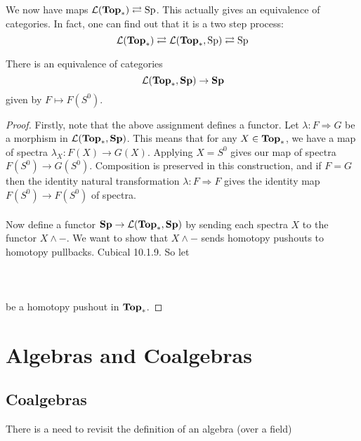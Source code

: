 \documentclass[a4paper]{article}
\begin{document}
We now have maps $\mathcal{L}(\bold{Top}_\ast)\rightleftarrows\text{Sp}$. This actually gives an equivalence of categories. In fact, one can find out that it is a two step process: $$\mathcal{L}(\bold{Top}_\ast)\rightleftarrows\mathcal{L}(\bold{Top}_\ast,\text{Sp})\rightleftarrows\text{Sp}$$

\begin{thm}{}{} There is an equivalence of categories $$\mathcal{L}(\bold{Top}_\ast,\bold{Sp})\to\bold{Sp}$$ given by $F\mapsto F(S^0)$. \tcbline
\begin{proof}
Firstly, note that the above assignment defines a functor. Let $\lambda:F\Rightarrow G$ be a morphism in $\mathcal{L}(\bold{Top}_\ast,\bold{Sp})$. This means that for any $X\in\bold{Top}_\ast$, we have a map of spectra $\lambda_X:F(X)\to G(X)$. Applying $X=S^0$ gives our map of spectra $F(S^0)\to G(S^0)$. Composition is preserved in this construction, and if $F=G$ then the identity natural transformation $\lambda:F\Rightarrow F$ gives the identity map $F(S^0)\to F(S^0)$ of spectra. \\~\\

Now define a functor $\bold{Sp}\to\mathcal{L}(\bold{Top}_\ast,\bold{Sp})$ by sending each spectra $X$ to the functor $X\wedge -$. We want to show that $X\wedge -$ sends homotopy pushouts to homotopy pullbacks. Cubical 10.1.9. So let \\~\\
\\~\\
be a homotopy pushout in $\bold{Top}_\ast$. 
\end{proof}
\end{thm}


\pagebreak
\section{Algebras and Coalgebras}
\subsection{Coalgebras}
There is a need to revisit the definition of an algebra (over a field)
\end{document}
